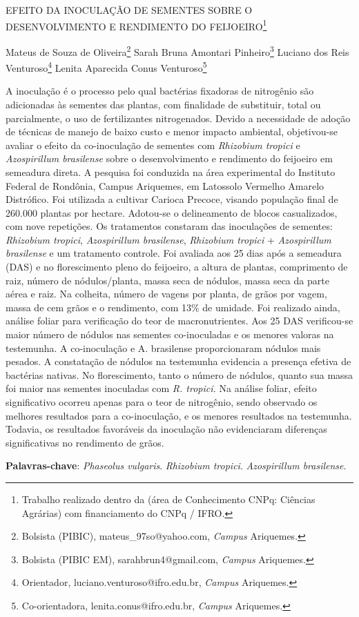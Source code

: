 \documentclass[article,12pt,onesidea,4paper,english,brazil]{abntex2}
\begin{document}
	
	
	\frenchspacing 
	
	\begin{center}
		\LARGE EFEITO DA INOCULAÇÃO DE SEMENTES SOBRE O DESENVOLVIMENTO E
		RENDIMENTO DO FEIJOEIRO\footnote{Trabalho realizado dentro da (área de Conhecimento CNPq: Ciências Agrárias) com financiamento do CNPq / IFRO.}
		
		\normalsize
		Mateus de Souza de Oliveira\footnote{Bolsista (PIBIC), mateus\_97so@yahoo.com, \textit{Campus} Ariquemes.} 
		Sarah Bruna Amontari Pinheiro\footnote{Bolsista (PIBIC EM), sarahbrun4@gmail.com, \textit{Campus} Ariquemes.} 
		Luciano dos Reis Venturoso\footnote{Orientador, luciano.venturoso@ifro.edu.br, \textit{Campus} Ariquemes.} 
		Lenita Aparecida Conus Venturoso\footnote{Co-orientadora, lenita.conus@ifro.edu.br, \textit{Campus} Ariquemes.} 
	\end{center}
	
	\noindent A inoculação é o processo pelo qual bactérias fixadoras de nitrogênio são
	adicionadas às sementes das plantas, com finalidade de substituir, total ou
	parcialmente, o uso de fertilizantes nitrogenados. Devido a necessidade de adoção
	de técnicas de manejo de baixo custo e menor impacto ambiental, objetivou-se
	avaliar o efeito da co-inoculação de sementes com \textit{Rhizobium tropici} e \textit{Azospirillum brasilense} sobre o desenvolvimento e rendimento do feijoeiro em semeadura direta.
	A pesquisa foi conduzida na área experimental do Instituto Federal de Rondônia,
	Campus Ariquemes, em Latossolo Vermelho Amarelo Distrófico. Foi utilizada a
	cultivar Carioca Precoce, visando população final de 260.000 plantas por hectare.
	Adotou-se o delineamento de blocos casualizados, com nove repetições. Os
	tratamentos constaram das inoculações de sementes: \textit{Rhizobium tropici},
	\textit{Azospirillum brasilense}, \textit{Rhizobium tropici} + \textit{Azospirillum brasilense} e um tratamento controle. Foi avaliada aos 25 dias após a semeadura (DAS) e no florescimento pleno do feijoeiro, a altura de plantas, comprimento de raiz, número de nódulos/planta, massa seca de nódulos, massa seca da parte aérea e raiz. Na colheita, número de vagens por planta, de grãos por vagem, massa de cem grãos e o rendimento, com
	13\% de umidade. Foi realizado ainda, análise foliar para verificação do teor de
	macronutrientes. Aos 25 DAS verificou-se maior número de nódulos nas sementes
	co-inoculadas e os menores valoras na testemunha. A co-inoculação e A. brasilense
	proporcionaram nódulos mais pesados. A constatação de nódulos na testemunha
	evidencia a presença efetiva de bactérias nativas. No florescimento, tanto o número
	de nódulos, quanto sua massa foi maior nas sementes inoculadas com \textit{R. tropici.} Na
	análise foliar, efeito significativo ocorreu apenas para o teor de nitrogênio, sendo
	observado os melhores resultados para a co-inoculação, e os menores resultados na
	testemunha. Todavia, os resultados favoráveis da inoculação não evidenciaram
	diferenças significativas no rendimento de grãos.
	
	\vspace{\onelineskip}
	
	\noindent
	\textbf{Palavras-chave}: \textit{Phaseolus vulgaris}. \textit{Rhizobium tropici}. \textit{Azospirillum brasilense}.
	
\end{document}
